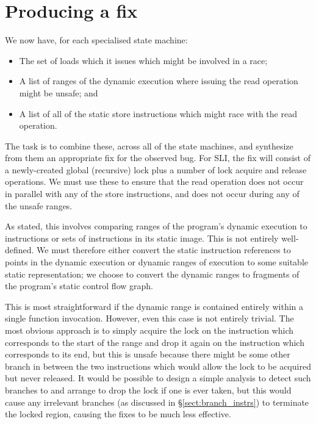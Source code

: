 \documentclass[10pt,letter,twocolumn]{sigplanconf}
\begin{document}
\section{Producing a fix}
We now have, for each specialised state machine:

\begin{itemize}
\item The set of loads which it issues which might be involved in a
  race;
\item A list of ranges of the dynamic execution where issuing the read
  operation might be unsafe; and
\item A list of all of the static store instructions which might race
  with the read operation.
\end{itemize}

The task is to combine these, across all of the state machines, and
synthesize from them an appropriate fix for the observed bug.  For
SLI, the fix will consist of a newly-created global (recursive) lock
plus a number of lock acquire and release operations.  We must use
these to ensure that the read operation does not occur in parallel
with any of the store instructions, and does not occur during any of
the unsafe ranges.

As stated, this involves comparing ranges of the program's dynamic
execution to instructions or sets of instructions in its static image.
This is not entirely well-defined.  We must therefore either convert
the static instruction references to points in the dynamic execution
or dynamic ranges of execution to some suitable static representation;
we choose to convert the dynamic ranges to fragments of the program's
static control flow graph.

This is most straightforward if the dynamic range is contained
entirely within a single function invocation.  However, even this case
is not entirely trivial.  The most obvious approach is to simply
acquire the lock on the instruction which corresponds to the start of
the range and drop it again on the instruction which corresponds to
its end, but this is unsafe because there might be some other branch
in between the two instructions which would allow the lock to be
acquired but never released.  It would be possible to design a simple
analysis to detect such branches to and arrange to drop the lock if
one is ever taken, but this would cause any irrelevant branches (as
discussed in \S\ref{sect:branch_instrs}) to terminate the locked
region, causing the fixes to be much less effective.
\end{document}
